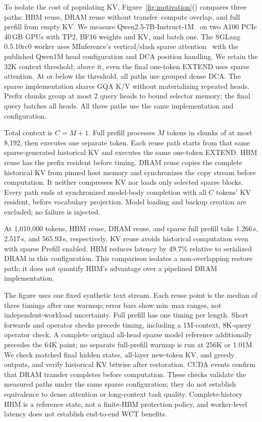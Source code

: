 To isolate the cost of populating KV,
Figure~\ref{fig:motivation}() compares
three paths: HBM reuse, DRAM reuse without transfer--compute overlap,
and full prefill from empty KV. We measure
Qwen2.5-7B-Instruct-1M~\cite{qwen2025qwen25oneM} on two A100 PCIe
40\,GB GPUs with TP2, BF16 weights and KV, and batch one. The SGLang
0.5.10rc0 worker uses MInference's vertical/slash sparse
attention~\cite{jiang2024minference} with the published Qwen1M head
configuration and DCA position handling. We retain the 32K context
threshold; above it, even the final one-token EXTEND uses sparse attention.
At or below the threshold, all paths use grouped dense DCA.
The sparse implementation shares GQA K/V without materializing repeated
heads. Prefix chunks group at most 2 query heads to bound selector
memory; the final query batches all heads. All three paths use the same
implementation and configuration.

Total context is $C=M+1$. Full prefill processes $M$ tokens in chunks of
at most 8,192, then executes one separate token. Each reuse path starts
from that same sparse-generated historical KV and executes the same
one-token EXTEND. HBM reuse has the prefix resident before timing.
DRAM reuse copies the complete historical KV from pinned host memory
and synchronizes the copy stream before computation. It neither
compresses KV nor loads only selected sparse blocks.
Every path ends at synchronized model-body completion with all $C$
tokens' KV resident, before vocabulary projection. Model loading and
backup creation are excluded; no failure is injected.

At 1,010,000 tokens, HBM reuse, DRAM reuse, and sparse full prefill
take 1.266\,s, 2.517\,s, and 565.93\,s, respectively. KV reuse avoids
historical computation even with sparse Prefill enabled. HBM reduces
latency by 49.7\% relative to serialized DRAM in this configuration.
This comparison isolates a non-overlapping restore path; it does not
quantify HBM's advantage over a pipelined DRAM implementation.

The figure uses one fixed synthetic text stream. Each reuse point is
the median of three timings after one warmup; error bars show min--max
ranges, not independent-workload uncertainty. Full prefill has one
timing per length. Short forwards and operator checks precede timing,
including a 1M-context, 8K-query operator check. A complete original
all-head sparse model reference additionally precedes the 64K point;
no separate full-prefill warmup is run at 256K or 1.01M.
We check matched final hidden states, all-layer new-token KV, and greedy
outputs, and verify historical KV bitwise after restoration. CUDA events
confirm that DRAM transfer completes before computation. These
checks validate the measured paths under the same sparse configuration;
they do not establish equivalence to dense attention or long-context
task quality. Complete-history HBM is a reference state, not a
finite-HBM protection policy, and worker-level latency does not establish
end-to-end WCT benefits.

